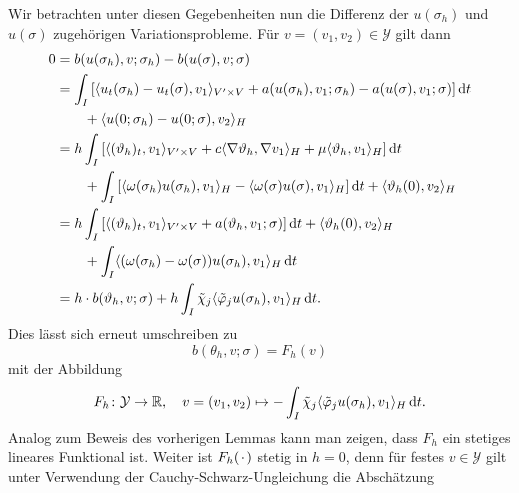\begin{Satz}
\begin{Beweis}
        Wir betrachten unter diesen Gegebenheiten nun die Differenz der $u(\sigma_{h})$ und $u(\sigma)$ zugehörigen Variationsprobleme.
        Für $v = (v_{1}, v_{2}) \in \mathcal Y$ gilt dann
        \begin{align}
            0
            &= b(u(\sigma_{h}), v; \sigma_{h}) - b(u(\sigma), v; \sigma)
            \\&= \int_{I} \left[ \langle u_{t}(\sigma_{h}) - u_{t}(\sigma),v_{1}\rangle_{V' \times V} + a(u(\sigma_{h}), v_{1}; \sigma_{h}) - a(u(\sigma), v_{1}; \sigma) \right] \mathop{}\!\mathrm{d} t
            \\&\qquad + \langle u(0; \sigma_{h}) - u(0; \sigma),v_{2}\rangle_{H}
            \\&=  h \int_{I} \left[ \langle(\vartheta_{h})_{t},v_{1}\rangle_{V' \times V} + c\langle\nabla \vartheta_{h},\nabla v_{1}\rangle_{H}  +  \mu \langle\vartheta_{h},v_{1}\rangle_{H} \right] \mathop{}\!\mathrm{d} t
            \\&\qquad + \int_{I} \left[ \langle\omega(\sigma_{h}) u(\sigma_{h}),v_{1}\rangle_{H} - \langle\omega(\sigma) u(\sigma),v_{1}\rangle_{H}  \right] \mathop{}\!\mathrm{d} t + \langle\vartheta_{h}(0),v_{2}\rangle_{H}
            \\&= h \int_{I} \left[ \langle(\vartheta_{h})_{t},v_{1}\rangle_{V' \times V} + a(\vartheta_{h}, v_{1}; \sigma)  \right] \mathop{}\!\mathrm{d} t + \langle\vartheta_{h}(0),v_{2}\rangle_{H}
            \\&\qquad +\int_{I} \langle(\omega(\sigma_{h}) - \omega(\sigma))u(\sigma_{h}),v_{1}\rangle_{H} \mathop{}\!\mathrm{d} t
            \\&= h \cdot b(\vartheta_{h}, v; \sigma) + h \int_{I} \tilde{\chi}_{j} \langle\tilde{\varphi}_{j} u(\sigma_{h}),v_{1}\rangle_{H} \mathop{}\!\mathrm{d} t.
        \end{align}
        Dies lässt sich erneut umschreiben zu
        \begin{equation}
            \label{eq:fettes_varprob}
            b(\theta_{h}, v; \sigma) = F_{h}(v)
        \end{equation}
        mit der Abbildung
        \begin{equation}
            F_{h} \colon \mathcal Y \to \mathbb{R}, \quad v = (v_{1}, v_{2}) \mapsto - \int_{I} \tilde{\chi}_{j} \langle\tilde{\varphi}_{j}  u(\sigma_{h}),v_{1}\rangle_{H} \mathop{}\!\mathrm{d} t.
        \end{equation}
        Analog zum Beweis des vorherigen Lemmas kann man zeigen, dass $F_{h}$ ein stetiges lineares Funktional ist.
        Weiter ist $F_{h}({\mkern2mu\cdot\mkern2mu})$ stetig in $h = 0$, denn für festes $v \in \mathcal Y$ gilt unter Verwendung der Cauchy-Schwarz-Ungleichung die Abschätzung
        \begin{align}

\end{align}
\end{Beweis}
\end{Satz}
